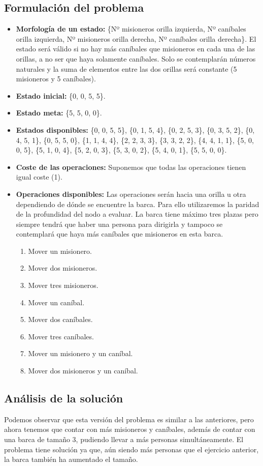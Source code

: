 \documentclass{article}
\begin{document}
\subsection{Formulación del problema}
\begin{itemize}
  \item \textbf{Morfología de un estado:} \{Nº misioneros orilla izquierda, Nº caníbales orilla izquierda, Nº misioneros orilla derecha, Nº caníbales orilla derecha\}. El estado será válido si no hay más caníbales que misioneros en cada una de las orillas, a no ser que haya solamente caníbales. Solo se contemplarán números naturales y la suma de elementos entre las dos orillas será constante (5 misioneros y 5 caníbales).
  \item \textbf{Estado inicial:} \{0, 0, 5, 5\}.
  \item \textbf{Estado meta:} \{5, 5, 0, 0\}.
  \item \textbf{Estados disponibles:} \{0, 0, 5, 5\}, \{0, 1, 5, 4\}, \{0, 2, 5, 3\}, \{0, 3, 5, 2\}, \{0, 4, 5, 1\}, \{0, 5, 5, 0\}, \{1, 1, 4, 4\}, \{2, 2, 3, 3\}, \{3, 3, 2, 2\}, \{4, 4, 1, 1\}, \{5, 0, 0, 5\}, \{5, 1, 0, 4\}, \{5, 2, 0, 3\}, \{5, 3, 0, 2\}, \{5, 4, 0, 1\}, \{5, 5, 0, 0\}.
  \item \textbf{Coste de las operaciones:} Suponemos que todas las operaciones tienen igual coste (1).
  \item \textbf{Operaciones disponibles:} Las operaciones serán hacia una orilla u otra dependiendo de dónde se encuentre la barca. Para ello utilizaremos la paridad de la profundidad del nodo a evaluar. La barca tiene máximo tres plazas pero siempre tendrá que haber una persona para dirigirla y tampoco se contemplará que haya más caníbales que misioneros en esta barca.
  \begin{enumerate}
    \item Mover un misionero.
    \item Mover dos misioneros.
    \item Mover tres misioneros.
    \item Mover un caníbal.
    \item Mover dos caníbales.
    \item Mover tres caníbales.
    \item Mover un misionero y un caníbal.
    \item Mover dos misioneros y un caníbal.
  \end{enumerate}
\end{itemize}

\subsection{Análisis de la solución}
Podemos observar que esta versión del problema es similar a las anteriores, pero ahora tenemos que contar con más misioneros y caníbales, además de contar con una barca de tamaño 3, pudiendo llevar a más personas simultáneamente. El problema tiene solución ya que, aún siendo más personas que el ejercicio anterior, la barca también ha aumentado el tamaño. \\
\end{document}
